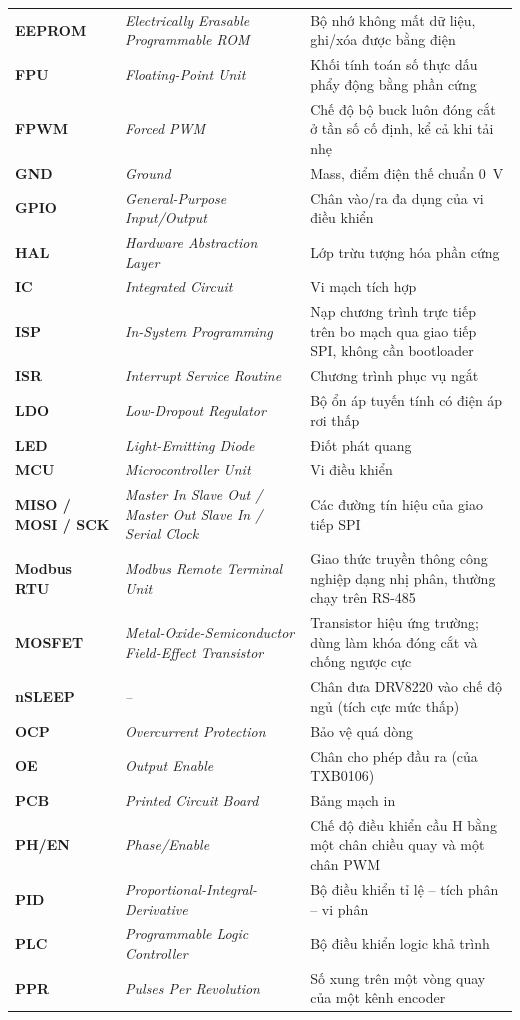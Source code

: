 {\begin{longtable}{@{}>{\raggedright\arraybackslash\bfseries}p{2.7cm}>{\raggedright\arraybackslash\itshape}p{4.6cm}>{\raggedright\arraybackslash}p{7.6cm}@{}}
EEPROM & Electrically Erasable Programmable ROM & Bộ nhớ không mất dữ liệu, ghi/xóa được bằng điện\\
FPU & Floating-Point Unit & Khối tính toán số thực dấu phẩy động bằng phần cứng\\
FPWM & Forced PWM & Chế độ bộ buck luôn đóng cắt ở tần số cố định, kể cả khi tải nhẹ\\
GND & Ground & Mass, điểm điện thế chuẩn \SI{0}{\volt}\\
GPIO & General-Purpose Input/Output & Chân vào/ra đa dụng của vi điều khiển\\
HAL & Hardware Abstraction Layer & Lớp trừu tượng hóa phần cứng\\
IC & Integrated Circuit & Vi mạch tích hợp\\
ISP & In-System Programming & Nạp chương trình trực tiếp trên bo mạch qua giao tiếp SPI, không cần bootloader\\
ISR & Interrupt Service Routine & Chương trình phục vụ ngắt\\
LDO & Low-Dropout Regulator & Bộ ổn áp tuyến tính có điện áp rơi thấp\\
LED & Light-Emitting Diode & Điốt phát quang\\
MCU & Microcontroller Unit & Vi điều khiển\\
MISO / MOSI / SCK & Master In Slave Out / Master Out Slave In / Serial Clock & Các đường tín hiệu của giao tiếp SPI\\
Modbus RTU & Modbus Remote Terminal Unit & Giao thức truyền thông công nghiệp dạng nhị phân, thường chạy trên RS-485\\
MOSFET & Metal-Oxide-Semiconductor Field-Effect Transistor & Transistor hiệu ứng trường; dùng làm khóa đóng cắt và chống ngược cực\\
nSLEEP & -- & Chân đưa DRV8220 vào chế độ ngủ (tích cực mức thấp)\\
OCP & Overcurrent Protection & Bảo vệ quá dòng\\
OE & Output Enable & Chân cho phép đầu ra (của TXB0106)\\
PCB & Printed Circuit Board & Bảng mạch in\\
PH/EN & Phase/Enable & Chế độ điều khiển cầu H bằng một chân chiều quay và một chân PWM\\
PID & Proportional-Integral-Derivative & Bộ điều khiển tỉ lệ -- tích phân -- vi phân\\
PLC & Programmable Logic Controller & Bộ điều khiển logic khả trình\\
PPR & Pulses Per Revolution & Số xung trên một vòng quay của một kênh encoder\\

\end{longtable}}
